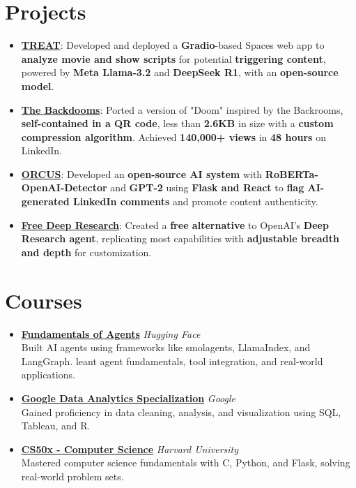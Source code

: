 \documentclass[letterpaper,10.8pt]{article}
\newcommand{\resumeItem}[2]{
  \item\small{
    \textbf{#1}{: #2 \vspace{-2pt}}
  }
}
\newcommand{\resumeSubHeadingListStart}{\begin{itemize}[leftmargin=*]}
\newcommand{\resumeSubHeadingListEnd}{\end{itemize}}
\begin{document}
\section*{Projects}
\resumeSubHeadingListStart
  \resumeItem{\href{https://trytreat.tech/}{TREAT}}{Developed and deployed a \textbf{Gradio}-based Spaces web app to \textbf{analyze movie and show scripts} for potential \textbf{triggering content}, powered by \textbf{Meta Llama-3.2} and \textbf{DeepSeek R1}, with an \textbf{open-source model}.}
  \vspace{5pt}
  \resumeItem{\href{https://github.com/Kuberwastaken/backdooms}{The Backdooms}}{Ported a version of "Doom" inspired by the Backrooms, \textbf{self-contained in a QR code}, less than \textbf{2.6KB} in size with a \textbf{custom compression algorithm}. Achieved \textbf{140,000+ views} in \textbf{48 hours} on LinkedIn.}
  \vspace{5pt}
  \resumeItem{\href{https://github.com/Kuberwastaken/ORCUS}{ORCUS}}{Developed an \textbf{open-source AI system} with \textbf{RoBERTa-OpenAI-Detector} and \textbf{GPT-2} using \textbf{Flask and React} to \textbf{flag AI-generated LinkedIn comments} and promote content authenticity.}
  \vspace{5pt}
  \resumeItem{\href{https://github.com/Kuberwastaken/free-deep-research}{Free Deep Research}}{Created a \textbf{free alternative} to OpenAI’s \textbf{Deep Research agent}, replicating most capabilities with \textbf{adjustable breadth and depth} for customization.}
\resumeSubHeadingListEnd

\section*{Courses}
\begin{itemize}[leftmargin=0.15in]
  \item \textbf{\href{https://cdn-uploads.huggingface.co/production/uploads/noauth/iD2BAETFKpkiYBWPVz1fn.webp}{Fundamentals of Agents}} \hfill \textit{Hugging Face}\\
    Built AI agents using frameworks like smolagents, LlamaIndex, and LangGraph. leant agent fundamentals, tool integration, and real-world applications.
  \item \textbf{\href{https://www.coursera.org/account/accomplishments/specialization/AS9JOBALFZSL}{Google Data Analytics Specialization}} \hfill \textit{Google}\\
    Gained proficiency in data cleaning, analysis, and visualization using SQL, Tableau, and R.
  \item \textbf{\href{https://certificates.cs50.io/fe4b0a5a-c586-4a15-91ec-6b8a65f829e4.pdf?size=letter}{CS50x - Computer Science}} \hfill \textit{Harvard University}\\
    Mastered computer science fundamentals with C, Python, and Flask, solving real-world problem sets.
\end{itemize}
\end{document}
